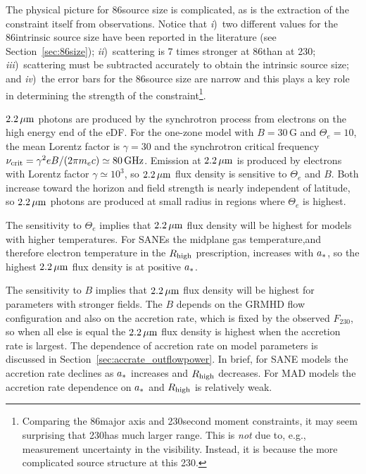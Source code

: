 The physical picture for 86\GHz source size is complicated, as is the extraction of the constraint itself from observations.
Notice that
\emph{i})~two different values for the 86\GHz intrinsic source size have been reported in the literature (see Section~\ref{sec:86size});
\emph{ii})~scattering is $7$ times stronger at 86\GHz than at 230\GHz;
\emph{iii})~scattering must be subtracted accurately to obtain the intrinsic source size; and
\emph{iv})~the error bars for the 86\GHz source size are narrow and this plays a key role in determining the strength of the constraint\footnote{Comparing the 86\GHz major axis and 230\GHz second moment constraints, it may seem surprising that 230\GHz has much larger range.
This is \emph{not} due to, e.g., measurement uncertainty in the visibility.
Instead, it is because the more complicated source structure at this 230\GHz.}.


$2.2\,\mu\mathrm{m}$ photons are produced by the synchrotron process from electrons on the high energy end of the eDF.
For the one-zone model with $B = 30$\,G and $\Theta_e = 10$, the mean Lorentz factor is $\gamma = 30$ and the synchrotron critical frequency $\nu_\mathrm{crit} = \gamma^2 e B/(2 \pi m_e c) \simeq 80\,\mathrm{GHz}$.
Emission at $2.2\,\mu\mathrm{m}$ is produced by electrons with Lorentz factor $\gamma \simeq 10^3$, so $2.2\,\mu\mathrm{m}$ flux density is sensitive to $\Theta_e$ and $B$.
Both increase toward the horizon and field strength is nearly independent of latitude, so $2.2\,\mu\mathrm{m}$ photons are produced at small radius in regions where $\Theta_e$ is highest.

The sensitivity to $\Theta_e$ implies that $2.2\,\mu\mathrm{m}$ flux density will be highest for models with higher temperatures.
For SANEs the midplane gas temperature,and therefore electron temperature in the $R_\mathrm{high}$ prescription, increases with $a_*$, so the highest $2.2\,\mu\mathrm{m}$ flux density is at positive $a_*$. 

The sensitivity to $B$ implies that $2.2\,\mu\mathrm{m}$ flux density will be highest for parameters with stronger fields.
The $B$ depends on the GRMHD flow configuration and also on the accretion rate, which is fixed by the observed $F_{230}$, so when all else is equal the $2.2\,\mu\mathrm{m}$ flux density is highest when the accretion rate is largest.  The dependence of accretion rate on model parameters is discussed in Section~\ref{sec:accrate_outflowpower}.  In brief, for SANE models the accretion rate declines as $a_*$ increases and $R_\mathrm{high}$ decreases. For MAD models the accretion rate dependence on $a_*$ and $R_\mathrm{high}$ is relatively weak.

